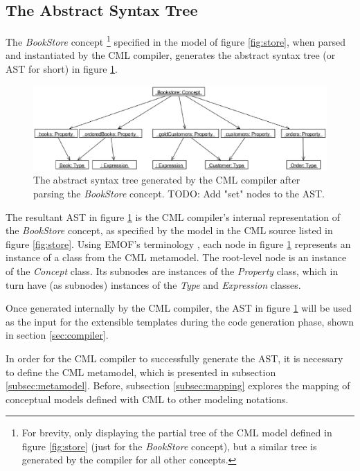 \subsection{The Abstract Syntax Tree}\label{subsec:ast}

The \emph{BookStore} concept
\footnote{For brevity,
only displaying the partial tree of the CML model defined in figure \ref{fig:store} (just for the \emph{BookStore} concept), 
but a similar tree is generated by the compiler for all other concepts.}
specified in the model of figure \ref{fig:store},
when parsed and instantiated by the CML compiler,
generates the abstract syntax tree (or AST for short) in figure \ref{fig:ast}.

\begin{figure}
\centering
\includegraphics[width=\textwidth]{language/figure-ast}
\caption{The abstract syntax tree generated by the CML compiler after parsing the \emph{BookStore} concept.
TODO: Add "set" nodes to the AST.}
\label{fig:ast}
\end{figure}

The resultant AST in figure \ref{fig:ast} is the CML compiler's internal representation of the \emph{BookStore} concept,
as specified by the model in the CML source listed in figure \ref{fig:store}. 
Using EMOF's terminology \cite{mof},
each node in figure \ref{fig:ast} represents an instance of a class from the CML metamodel.
The root-level node is an instance of the \emph{Concept} class. 
Its subnodes are instances of the \emph{Property} class,
which in turn have (as subnodes) instances of the \emph{Type} and \emph{Expression} classes.

Once generated internally by the CML compiler,
the AST in figure \ref{fig:ast} will be used as the input for the extensible templates during the code generation phase,
shown in section \ref{sec:compiler}.

In order for the CML compiler to successfully generate the AST,
it is necessary to define the CML metamodel,
which is presented in subsection \ref{subsec:metamodel}.
Before, subsection \ref{subsec:mapping} explores the mapping of conceptual models defined with CML to other modeling notations.

